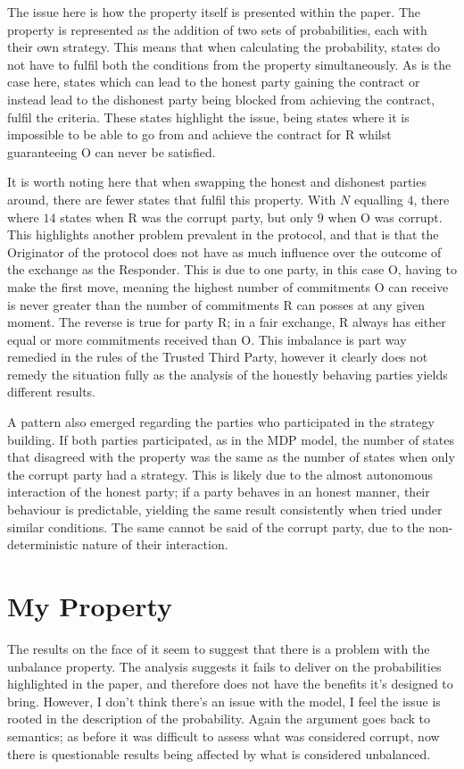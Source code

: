 \documentclass{l4proj}
\begin{document}
The issue here is how the property itself is presented within the paper. The property is represented as the addition of two sets of probabilities, each with their own strategy. This means that when calculating the probability, states do not have to fulfil both the conditions from the property simultaneously. As is the case here, states which can lead to the honest party gaining the contract or instead lead to the dishonest party being blocked from achieving the contract, fulfil the criteria. These states highlight the issue, being states where it is impossible to be able to go from and achieve the contract for R whilst guaranteeing O can never be satisfied.

It is worth noting here that when swapping the honest and dishonest parties around, there are fewer states that fulfil this property. With $N$ equalling $4$, there where $14$ states when R was the corrupt party, but only $9$ when O was corrupt.  This highlights another problem prevalent in the protocol, and that is that the Originator of the protocol does not have as much influence over the outcome of the exchange as the Responder. This is due to one party, in this case O, having to make the first move, meaning the highest number of commitments O can receive is never greater than the number of commitments R can posses at any given moment. The reverse is true for party R; in a fair exchange, R always has either equal or more commitments received than O. This imbalance is part way remedied in the rules of the Trusted Third Party, however it clearly does not remedy the situation fully as the analysis of the honestly behaving parties yields different results.

A pattern also emerged regarding the parties who participated in the strategy building. If both parties participated, as in the MDP model, the number of states that disagreed with the property was the same as the number of states when only the corrupt party had a strategy. This is likely due to the almost autonomous interaction of the honest party; if a party behaves in an honest manner, their behaviour is predictable, yielding the same result consistently when tried under similar conditions. The same cannot be said of the corrupt party, due to the non-deterministic nature of their interaction.

\section{My Property}

The results on the face of it seem to suggest that there is a problem with the unbalance property. The analysis suggests it fails to deliver on the probabilities highlighted in the paper, and therefore does not have the benefits it's designed to bring. However, I don't think there's an issue with the model, I feel the issue is rooted in the description of the probability. Again the argument goes back to semantics; as before it was difficult to assess what was considered corrupt, now there is questionable results being affected by what is considered unbalanced. 
\end{document}
